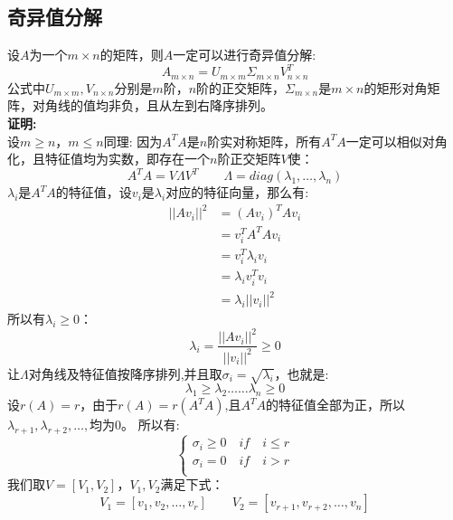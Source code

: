\documentclass[withoutpreface,bwprint]{cumcmthesis} %
\begin{document}
\subsection{奇异值分解}
	设$A$为一个$m \times n$的矩阵，则$A$一定可以进行奇异值分解:
	\begin{equation}
		A_{m \times n}=U_{m \times m}\Sigma_{m \times n} V_{n \times n}^T
	\end{equation}
	公式中$U_{m \times m}, V_{n \times n}$分别是$m$阶，$n$阶的正交矩阵，$\Sigma_{m \times n}$是$m \times n$的矩形对角矩阵，对角线的值均非负，且从左到右降序排列。\\
	\textbf{证明:}\\
	设$m \geq n$，$m \leq n$同理:
	因为$A^TA$是$n$阶实对称矩阵，所有$A^TA$一定可以相似对角化，且特征值均为实数，即存在一个$n$阶正交矩阵$V$使：
	\begin{equation}
		A^TA=V \Lambda V^T \quad \quad \Lambda=diag(\lambda_1,\ldots,\lambda_n)
	\end{equation}
	$\lambda_i$是$A^TA$的特征值，设$v_i$是$\lambda_i$对应的特征向量，那么有:
	\begin{align*}
		||Av_i||^2 & =\left(Av_i\right)^TAv_i\\
					&=v_i^TA^T Av_i\\
					&=v_i^T \lambda_i v_i\\
					&=\lambda_i v_i^Tv_i\\
					&=\lambda_i||v_i||^2
	\end{align*}
	所以有$\lambda_i \geq 0$：
	\begin{equation}
		\lambda_i=\dfrac{||Av_i||^2}{||v_i||^2}\geq0
	\end{equation}	
	让$\Lambda$对角线及特征值按降序排列,并且取$\sigma_i= \sqrt{\lambda_i}$，也就是:
	\begin{equation}
		\lambda_1 \geq \lambda_2 \ldots \ldots \lambda_n \geq 0
	\end{equation}
	设$r(A)=r$，由于$r(A)=r(A^TA)$,且$A^TA$的特征值全部为正，所以$\lambda_{r+1},\lambda_{r+2},\ldots,\label{n}$均为$0$。
	所以有:
	\begin{equation}
		\begin{cases}
			\sigma_i\geq 0  \quad if \quad i\leq r\\
			\sigma_i= 0  \quad if \quad i > r\\
		\end{cases}
	\end{equation}
	我们取$V=\left[ V_1,V_2 \right]$，$V_1,V_2$满足下式：
	\begin{equation}
				V_1=\left[ v_1,v_2,\ldots,v_r \right] \quad \quad V_2=\left[v_{r+1},v_{r+2},\ldots,v_{n} \right]
	\end{equation}
\end{document}

